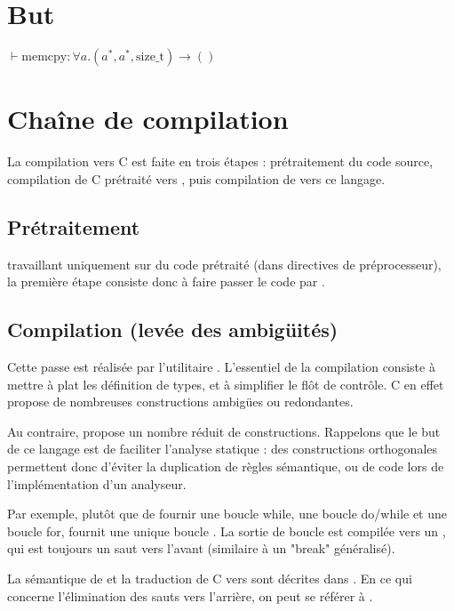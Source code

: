 \section{But}

$⊢ \text{memcpy} : ∀ a . (a^*, a^*, \text{size\_t}) → ()$

\section{Chaîne de compilation}

La compilation vers C est faite en trois étapes : prétraitement du code source,
compilation de C prétraité vers \newspeak{}, puis compilation de \newspeak{}
vers ce langage.



\subsection{Prétraitement}

\ctonewspeak{} travaillant uniquement sur du code prétraité (dans directives de
préprocesseur), la première étape consiste donc à faire passer le code par \cpp.

\subsection{Compilation (levée des ambigüités)}

Cette passe est réalisée par l'utilitaire \ctonewspeak{}. L'essentiel de la
compilation consiste à mettre à plat les définition de types, et à simplifier le
flôt de contrôle. C en effet propose de nombreuses constructions ambigües ou
redondantes.

Au contraire, \newspeak{} propose un nombre réduit de constructions. Rappelons
que le but de ce langage est de faciliter l'analyse statique : des constructions
orthogonales permettent donc d'éviter la duplication de règles sémantique, ou de
code lors de l'implémentation d'un analyseur.

Par exemple, plutôt que de fournir une boucle while, une boucle do/while et une
boucle for, \newspeak{} fournit une unique boucle \npkWhile{}. La sortie de
boucle est compilée vers un \npkGoto{}, qui est toujours un saut vers l'avant
(similaire à un "break" généralisé).

La sémantique de \newspeak{} et la traduction de C vers \newspeak{} sont
décrites dans \cite{newspeak}. En ce qui concerne l'élimination des sauts vers
l'arrière, on peut se référer à \cite{goto}.


